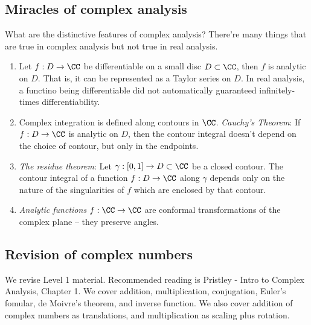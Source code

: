 \subsection{Miracles of complex analysis}
What are the distinctive features of complex analysis? There're many things that
are true in complex analysis but not true in real analysis.
\begin{enumerate}
  \item Let $f:D\to\CC$ be differentiable on a small disc $D\subset\CC$, then
    $f$ is analytic on $D$. That is, it can be represented as a Taylor series on
    $D$. In real analysis, a functino being differentiable did not automatically
    guaranteed infinitely-times differentiability.
  \item Complex integration is defined along contours in $\CC$. \emph{Cauchy's
    Theorem}: If $f:D\to\CC$ is analytic on $D$, then the contour integral
    doesn't depend on the choice of contour, but only in the endpoints.
  \item \emph{The residue theorem}: Let $\gamma:[0,1]\to D\subset\CC$ be a closed
    contour. The contour integral of a function $f:D\to\CC$ along $\gamma$
    depends only on the nature of the singularities of $f$ which are enclosed by
    that contour.
  \item \emph{Analytic functions} $f:\CC\to\CC$ are conformal transformations of
    the complex plane -- they preserve angles.
\end{enumerate}
\subsection{Revision of complex numbers}
We revise Level 1 material. Recommended reading is Pristley - Intro to Complex
Analysis, Chapter 1. We cover addition, multiplication, conjugation, Euler's
fomular, de Moivre's theorem, and inverse function. We also cover addition of
complex numbers as translations, and multiplication as scaling plus rotation.
